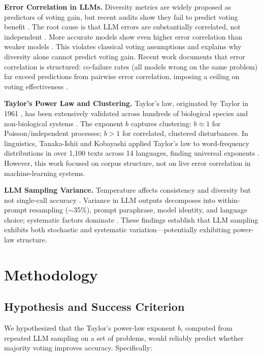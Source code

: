 \documentclass[11pt,letterpaper]{article}
\begin{document}
\textbf{Error Correlation in LLMs.} Diversity metrics are widely proposed as predictors of voting gain, but recent audits show they fail to predict voting benefit \citep{Kim2026}. The root cause is that LLM errors are substantially correlated, not independent \citep{Taori2023,Zatuchin2026}. More accurate models show even higher error correlation than weaker models \citep{Zatuchin2026}. This violates classical voting assumptions and explains why diversity alone cannot predict voting gain. Recent work documents that error correlation is structured: co-failure rates (all models wrong on the same problem) far exceed predictions from pairwise error correlation, imposing a ceiling on voting effectiveness \citep{Chen2026}.

\textbf{Taylor's Power Law and Clustering.} Taylor's law, originated by Taylor in 1961 \citep{Taylor1961}, has been extensively validated across hundreds of biological species and non-biological systems \citep{Riordan2020}. The exponent $b$ captures clustering: $b \approx 1$ for Poisson/independent processes; $b > 1$ for correlated, clustered disturbances. In linguistics, Tanaka-Ishii and Kobayashi applied Taylor's law to word-frequency distributions in over 1,100 texts across 14 languages, finding universal exponents \citep{Kobayashi2018}. However, this work focused on corpus structure, not on live error correlation in machine-learning systems.

\textbf{LLM Sampling Variance.} Temperature affects consistency and diversity but not single-call accuracy \citep{Holtzman2019}. Variance in LLM outputs decomposes into within-prompt resampling ($\sim$35\%), prompt paraphrase, model identity, and language choice; systematic factors dominate \citep{Ouyang2022}. These findings establish that LLM sampling exhibits both stochastic and systematic variation---potentially exhibiting power-law structure.

\section{Methodology}

\subsection{Hypothesis and Success Criterion}

We hypothesized that the Taylor's power-law exponent $b$, computed from repeated LLM sampling on a set of problems, would reliably predict whether majority voting improves accuracy. Specifically:
\end{document}
